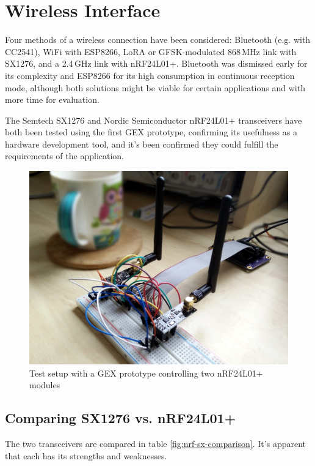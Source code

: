 \chapter{Wireless Interface} \label{sec:wireless}

Four methods of a wireless connection have been considered: Bluetooth (e.g. with CC2541), WiFi with ESP8266, LoRA or GFSK-modulated 868\,MHz link with SX1276, and a 2.4\,GHz link with nRF24L01+. Bluetooth was dismissed early for its complexity and ESP8266 for its high consumption in continuous reception mode, although both solutions might be viable for certain applications and with more time for evaluation. 

The Semtech SX1276 and Nordic Semiconductor nRF24L01+ transceivers have both been tested using the first GEX prototype, confirming its usefulness as a hardware development tool, and it's been confirmed they could fulfill the requirements of the application.

\begin{figure}[h]
	\centering
	\includegraphics[width=.7\textwidth]{img/nrf-testing.jpg}
	\caption{Test setup with a GEX prototype controlling two nRF24L01+ modules}
\end{figure}


\section{Comparing SX1276 vs. nRF24L01+}

The two transceivers are compared in table \ref{fig:nrf-sx-comparison}. It's apparent that each has its strengths and weaknesses.

